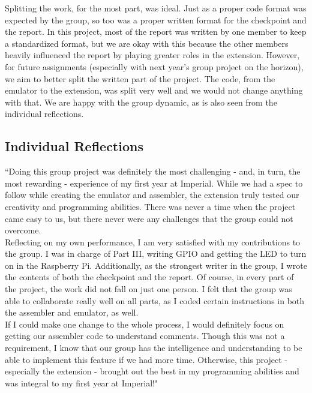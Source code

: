 \documentclass[11pt]{article}
\newenvironment{myquote}%
  {\list{}{\leftmargin=0.0in\rightmargin=0.0in}\item[]}%
  {\endlist}
\begin{document}
Splitting the work, for the most part, was ideal. Just as a proper code format was expected by the group, so too was a proper written format for the checkpoint and the report. In this project, most of the report was written by one member to keep a standardized format, but we are okay with this because the other members heavily influenced the report by playing greater roles in the extension. However, for future assignments (especially with next year's group project on the horizon), we aim to better split the written part of the project. The code, from the emulator to the extension, was split very well and we would not change anything with that. We are happy with the group dynamic, as is also seen from the individual reflections.

\subsection{Individual Reflections}

\begin{myquote}
``Doing this group project was definitely the most challenging - and, in turn, the most rewarding - experience of my first year at Imperial. While we had a spec to follow while creating the emulator and assembler, the extension truly tested our creativity and programming abilities. There was never a time when the project came easy to us, but there never were any challenges that the group could not overcome.
\\Reflecting on my own performance, I am very satisfied with my contributions to the group. I was in charge of Part III, writing GPIO and getting the LED to turn on in the Raspberry Pi. Additionally, as the strongest writer in the group, I wrote the contents of both the checkpoint and the report. Of course, in every part of the project, the work did not fall on just one person. I felt that the group was able to collaborate really well on all parts, as I coded certain instructions in both the assembler and emulator, as well.
\\If I could make one change to the whole process, I would definitely focus on getting our assembler code to understand comments. Though this was not a requirement, I know that our group has the intelligence and understanding to be able to implement this feature if we had more time. Otherwise, this project - especially the extension - brought out the best in my programming abilities and was integral to my first year at Imperial!"
\end{myquote}
\end{document}
